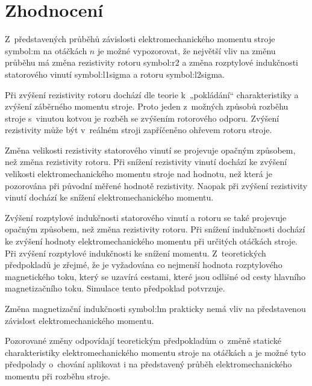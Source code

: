 \documentclass[a4paper, twoside, 11pt]{article}
\begin{document}
\newpage
{} 
\section*{Zhodnocení}
Z~představených průběhů závislosti elektromechanického momentu stroje \gls{symbol:m} na otáčkách $n$ je možné vypozorovat, že největší vliv na změnu průběhu má změna rezistivity rotoru \gls{symbol:r2} a změna rozptylové indukčnosti statorového vinutí \gls{symbol:l1sigma} a rotoru \gls{symbol:l2sigma}.\par
Při zvýšení rezistivity rotoru dochází dle teorie k~„pokládání“ charakteristiky a zvýšení záběrného momentu stroje. Proto jeden z~možných způsobů rozběhu stroje s~vinutou kotvou je rozběh se zvýšením rotorového odporu. Zvýšení rezistivity může být v~reálném stroji zapříčeněno ohřevem rotoru stroje.\par
Změna velikosti rezistivity statorového vinutí se projevuje opačným způsobem, než změna rezistivity rotoru. Při snížení rezistivity vinutí dochází ke zvýšení velikosti elektromechanického momentu stroje nad hodnotu, než která je pozorována při původní měřené hodnotě rezistivity. Naopak při zvýšení rezistivity vinutí dochází ke snížení elektromechanického momentu.\par
Zvýšení rozptylové indukčnosti statorového vinutí a rotoru se také projevuje opačným způsobem, než změna rezistivity rotoru. Při snížení indukčnosti dochází ke zvýšení hodnoty elektromechanického momentu při určitých otáčkách stroje. Při zvýšení rozptylové indukčnosti ke snížení momentu. Z~teoretických předpokladů je zřejmé, že je vyžadována co nejmenší hodnota rozptylového magnetického toku, který se uzavírá cestami, které jsou odlišné od cesty hlavního magnetizačního toku. Simulace tento předpoklad potvrzuje.\par
Změna magnetizační indukčnosti \gls{symbol:lm} prakticky nemá vliv na představenou závislost elektromechanického momentu.\par
Pozorované změny odpovídají teoretickým předpokladům o~změně statické charakteristiky elektromechanického momentu stroje na otáčkách a je možné tyto předpolady o~chování aplikovat i na představený průběh elektromechanického momentu při rozběhu stroje.

\flushbottom %

\end{document}

